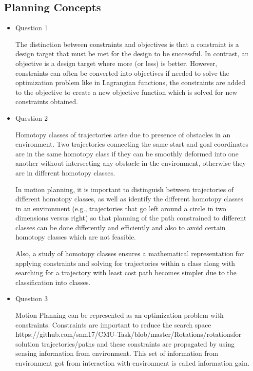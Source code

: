 \documentclass[paper=a4, fontsize=11pt]{scrartcl} %
\numberwithin{equation}{section} %
\numberwithin{figure}{section} %
\numberwithin{table}{section} %
\begin{document}
\subsection{Planning Concepts}

\begin{itemize}
\item Question 1

The distinction between constraints and objectives is that a constraint is a design target that must be met for the design to be successful. In contrast, an objective is a design target where more (or less) is better. 
However, constraints can often be converted into objectives if needed to solve the optimization problem like in Lagrangian functions, the constraints are added to the objective to create a new objective function which is solved for new constraints obtained.

\item Question 2

Homotopy classes of trajectories arise due to presence of obstacles in an environment. Two trajectories connecting the same start and goal coordinates are in the same homotopy class if they can be smoothly deformed into one another without intersecting any obstacle in the environment, otherwise they are in different homotopy classes.
 
In motion planning, it is important to distinguish between trajectories of different homotopy classes, as well as identify the different homotopy classes in an environment (e.g., trajectories that go left around a circle in two dimensions versus right) so that planning of the path constrained to different classes can be done differently and efficiently and also to avoid certain homotopy classes which are not feasible.

Also, a study of homotopy classes ensures a mathematical representation for applying constraints and solving for trajectories within a class along with searching for a trajectory with least cost path becomes simpler due to the classification into classes.

\item Question 3

Motion Planning can be represented as an optimization problem with constraints. Constraints are important to reduce the search space https://github.com/sam17/CMU-Task/blob/master/Rotations/rotationsfor solution trajectories/paths and these constraints are propagated by using sensing information from environment. This set of information from environment got from interaction with environment is called information gain.


\end{itemize}
\end{document}
